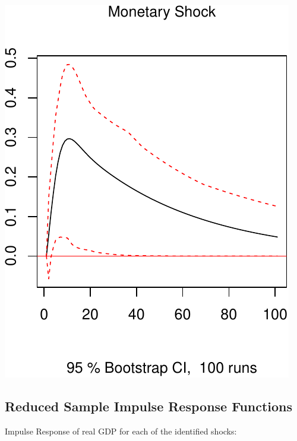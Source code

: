 \documentclass[11pt,preprint, authoryear]{elsarticle}
\numberwithin{equation}{section}
\numberwithin{figure}{section}
\numberwithin{table}{section}
\begin{document}
\includegraphics{TS_proj_files/figure-latex/unnamed-chunk-44-3.pdf}

\newpage

\hypertarget{reduced-sample-impulse-response-functions}{%
\subsection{Reduced Sample Impulse Response
Functions}\label{reduced-sample-impulse-response-functions}}

Impulse Response of real GDP for each of the identified shocks:
\end{document}
